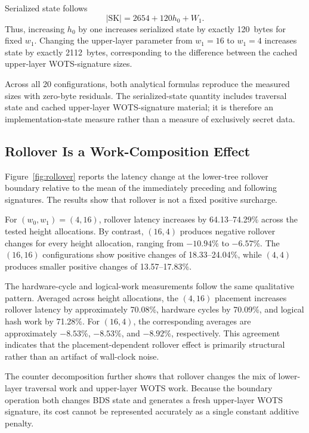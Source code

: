 \documentclass[pdflatex,sn-mathphys-num]{sn-jnl}
\begin{document}
Serialized state follows
\[
|\mathrm{SK}|=2654+120h_0+W_1.
\]
Thus, increasing $h_0$ by one increases serialized state by exactly
120~bytes for fixed $w_1$. Changing the upper-layer parameter from
$w_1=16$ to $w_1=4$ increases state by exactly 2112~bytes, corresponding
to the difference between the cached upper-layer WOTS-signature sizes.

Across all 20 configurations, both analytical formulas reproduce the
measured sizes with zero-byte residuals. The serialized-state quantity
includes traversal state and cached upper-layer WOTS-signature material;
it is therefore an implementation-state measure rather than a measure
of exclusively secret data.


\subsection{Rollover Is a Work-Composition Effect}
\label{sec:results_rollover}

Figure~\ref{fig:rollover} reports the latency change at the lower-tree
rollover boundary relative to the mean of the immediately preceding and
following signatures. The results show that rollover is not a fixed
positive surcharge.

For $(w_0,w_1)=(4,16)$, rollover latency increases by
64.13--74.29\% across the tested height allocations. By contrast,
$(16,4)$ produces negative rollover changes for every height allocation,
ranging from $-10.94$\% to $-6.57$\%. The $(16,16)$ configurations
show positive changes of 18.33--24.04\%, while $(4,4)$ produces
smaller positive changes of 13.57--17.83\%.

The hardware-cycle and logical-work measurements follow the same
qualitative pattern. Averaged across height allocations, the
$(4,16)$ placement increases rollover latency by approximately
70.08\%, hardware cycles by 70.09\%, and logical hash work by 71.28\%.
For $(16,4)$, the corresponding averages are approximately
$-8.53$\%, $-8.53$\%, and $-8.92$\%, respectively. This agreement
indicates that the placement-dependent rollover effect is primarily
structural rather than an artifact of wall-clock noise.

The counter decomposition further shows that rollover changes the mix
of lower-layer traversal work and upper-layer WOTS work. Because the
boundary operation both changes BDS state and generates a fresh
upper-layer WOTS signature, its cost cannot be represented accurately
as a single constant additive penalty.
\end{document}
